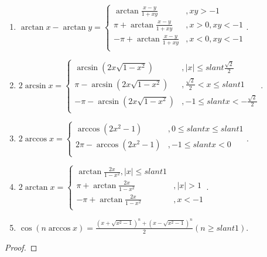 \documentclass[../../main.tex]{subfiles}
\begin{document}
\begin{theorem}[常用反三角函数性质]
\begin{enumerate}
\item $\arctan x-\arctan y=\begin{cases}
\arctan \frac{x-y}{1+xy}&,xy>-1\\
\pi +\arctan \frac{x-y}{1+xy}&,x>0,xy<-1\\
-\pi +\arctan \frac{x-y}{1+xy}&,x<0,xy<-1\\
\end{cases}.$

\item $2\arcsin x=\begin{cases}
\arcsin \left( 2x\sqrt{1-x^2} \right) &,\left| x \right|\leqslant slant \frac{\sqrt{2}}{2}\\
\pi -\arcsin \left( 2x\sqrt{1-x^2} \right) &,\frac{\sqrt{2}}{2}<x\leqslant slant 1\\
-\pi -\arcsin \left( 2x\sqrt{1-x^2} \right) &,-1\leqslant slant x<-\frac{\sqrt{2}}{2}\\
\end{cases}.$

\item $2\arccos x=\begin{cases}
\arccos \left( 2x^2-1 \right) &,0\leqslant slant x\leqslant slant 1\\
2\pi -\arccos \left( 2x^2-1 \right) &,-1\leqslant slant x<0\\
\end{cases}.$

\item $2\arctan x=\begin{cases}
\arctan \frac{2x}{1-x^2},\left| x \right|\leqslant slant 1\\
\pi +\arctan \frac{2x}{1-x^2}&,\left| x \right|>1\\
-\pi +\arctan \frac{2x}{1-x^2}&,x<-1\\
\end{cases}.$

\item $\cos \left( n\arccos x \right) =\frac{\left( x+\sqrt{x^2-1} \right) ^n+\left( x-\sqrt{x^2-1} \right) ^n}{2}\left( n\geqslant slant 1 \right) .$
\end{enumerate}
\end{theorem}
\begin{proof}

\end{proof}
\end{document}
